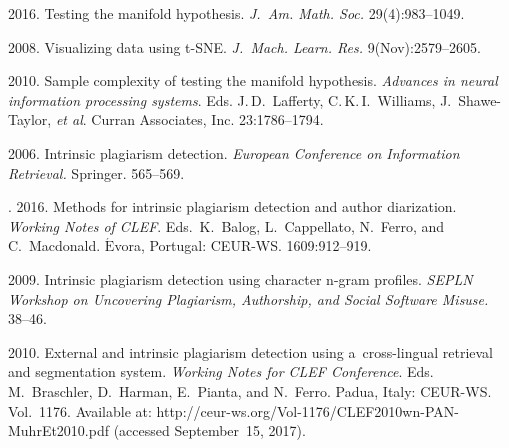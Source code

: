   \begin{multicols}{2}

\renewcommand{\bibname}{\protect\rmfamily References}

{\small\frenchspacing
 {\baselineskip=11.3pt
 \begin{thebibliography}{99}


2016. Testing the manifold hypothesis. \textit{J.~Am. Math. Soc.} 
29(4):983--1049. 

2008. Visualizing data using t-SNE. \textit{J.~Mach. Learn. Res.} 
9(Nov):2579--2605.

2010. Sample complexity of testing the manifold hypothesis. 
\textit{Advances in neural 
information 
processing systems}. Eds. J.\,D.~Lafferty, C.\,K.\,I.~Williams, J.~Shawe-Taylor, 
\textit{et al}. Curran Associates, Inc. 23:1786--1794.

 2006. Intrinsic plagiarism detection. \textit{European Conference on 
 Information Retrieval.} Springer. 565--569.

  . 
  2016. Methods for intrinsic plagiarism detection and author diarization. 
\textit{Working Notes  of CLEF}. Eds.\ K.~Balog, L.~Cappellato, N.~Ferro,
and C.~Macdonald.  $\acute{\mbox{E}}$vora, Portugal:
 CEUR-WS. 1609:912--919.
 
 2009. Intrinsic plagiarism detection using character n-gram profiles. 
 \textit{SEPLN Workshop on Uncovering Plagiarism, Authorship, and Social 
 Software Misuse.} 38--46.


  2010. External and intrinsic plagiarism detection using a~cross-lingual retrieval
   and segmentation system. \textit{Working Notes for CLEF Conference}.
   Eds. M.~Braschler, 
  D.~Harman, E.~Pianta, and N.~Ferro. Padua, Italy: CEUR-WS. 
  Vol.~1176. Available at: 
  {\sf http://ceur-ws.org/Vol-1176/CLEF2010wn-PAN-MuhrEt2010.pdf} 
  (accessed September~15, 2017).



\end{thebibliography}}}
\end{multicols}
